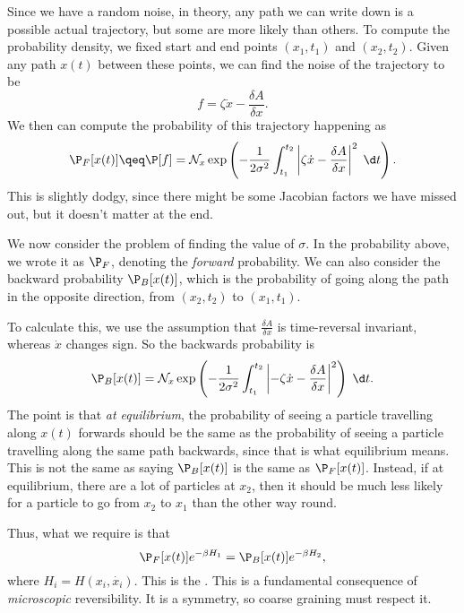 \documentclass[a4paper]{article}
\begin{document}
Since we have a random noise, in theory, any path we can write down is a possible actual trajectory, but some are more likely than others. To compute the probability density, we fixed start and end points $(x_1, t_1)$ and $(x_2, t_2)$. Given any path $x(t)$ between these points, we can find the noise of the trajectory to be
\[
  f = \zeta \dot{x} - \frac{\delta A}{\delta x}.
\]
We then can compute the probability of this trajectory happening as
\[
  \P_F[x(t)] \qeq \P[f] = \mathcal{N}_x \exp \left( -\frac{1}{2 \sigma^2} \int_{t_1}^{t_2} \left|\zeta \dot{x} - \frac{\delta A}{\delta x}\right|^2\;\d t\right).
\]
This is slightly dodgy, since there might be some Jacobian factors we have missed out, but it doesn't matter at the end.

We now consider the problem of finding the value of $\sigma$. In the probability above, we wrote it as $\P_F$, denoting the \emph{forward} probability. We can also consider the backward probability $\P_B[x(t)]$, which is the probability of going along the path in the opposite direction, from $(x_2, t_2)$ to $(x_1, t_1)$.

To calculate this, we use the assumption that $\frac{\delta A}{\delta x}$ is time-reversal invariant, whereas $\dot{x}$ changes sign. So the backwards probability is
\[
  \P_B[x(t)] = \mathcal{N}_x \exp \left( - \frac{1}{2\sigma^2}\int_{t_1}^{t_2} \left|-\zeta\dot{x} - \frac{\delta A}{\delta x}\right|^2\right)\;\d t.
\]
The point is that \emph{at equilibrium}, the probability of seeing a particle travelling along $x(t)$ forwards should be the same as the probability of seeing a particle travelling along the same path backwards, since that is what equilibrium means. This is not the same as saying $\P_B[x(t)]$ is the same as $\P_F[x(t)]$. Instead, if at equilibrium, there are a lot of particles at $x_2$, then it should be much less likely for a particle to go from $x_2$ to $x_1$ than the other way round.

Thus, what we require is that 
\[
  \P_F[x(t)] e^{-\beta H_1} = \P_B[x(t)] e^{-\beta H_2},
\]
where $H_i = H(x_i, \dot{x_i})$. This is the . This is a fundamental consequence of \emph{microscopic} reversibility. It is a symmetry, so coarse graining must respect it.
\end{document}
